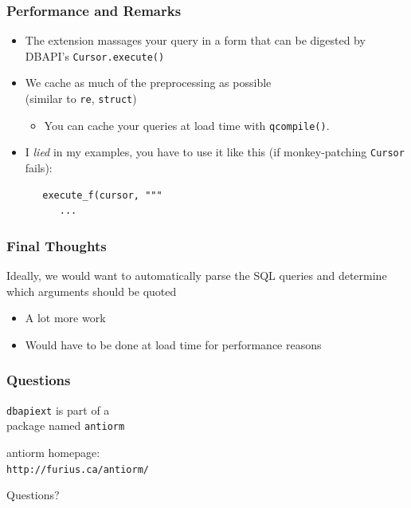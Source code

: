 \documentclass{beamer}
\begin{document}
\begin{frame}[fragile]
  \frametitle{Performance and Remarks}

  \begin{itemize}
  \item The extension massages your query in a form that can be digested by
    DBAPI's \texttt{Cursor.execute()}

  \item We cache as much of the preprocessing as possible \\
(similar to \texttt{re}, \texttt{struct})
    \begin{itemize}
    \item You can cache your queries at load time with \texttt{qcompile()}.
    \end{itemize}

\pause
  \item I \emph{lied} in my examples, you have to use it like this (if
    monkey-patching \texttt{Cursor} fails):
\begin{verbatim}
   execute_f(cursor, """
      ...
\end{verbatim}

  \end{itemize}

\end{frame}



\begin{frame}[fragile]
  \frametitle{Final Thoughts}

Ideally, we would want to automatically parse the SQL queries and
determine which arguments should be quoted

  \begin{itemize}
  \item A lot more work
  \item Would have to be done at load time for performance reasons
  \end{itemize}


\end{frame}



\begin{frame}[fragile]
  \frametitle{Questions}

  \begin{center}


{\Large
\texttt{dbapiext} is part of a \\
package named \texttt{antiorm}
}

\vfill

{\LARGE
antiorm homepage: \\
\verb=http://furius.ca/antiorm/=
}

\vfill

{\LARGE Questions?}

  \end{center}

\end{frame}


\end{document}
